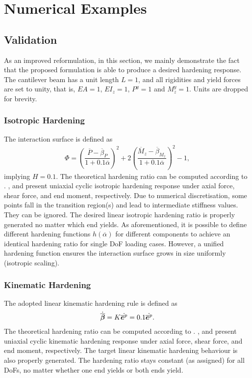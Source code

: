 \section{Numerical Examples}
\subsection{Validation}
As an improved reformulation, in this section, we mainly demonstrate the fact that the proposed formulation is able to produce a desired hardening response.
The cantilever beam has a unit length $L=1$, and all rigidities and yield forces are set to unity, that is, $EA=1$, $EI_z=1$, $P^y=1$ and $M^y_z=1$.
Units are dropped for brevity.
\subsubsection{Isotropic Hardening}
The interaction surface is defined as
\begin{gather}
\Phi=\left(\dfrac{\overline{P}-\overline{\beta}_P}{1+0.1\overline{\alpha}}\right)^2+2\left(\dfrac{\overline{M}_z-\overline{\beta}_{M_z}}{1+0.1\overline{\alpha}}\right)^2-1,
\end{gather}
implying $H=0.1$.
The theoretical hardening ratio can be computed according to .
,  and  present uniaxial cyclic isotropic hardening response under axial force, shear force, and end moment, respectively.
Due to numerical discretisation, some points fall in the transition region(s) and lead to intermediate stiffness values.
They can be ignored.
The desired linear isotropic hardening ratio is properly generated no matter which end yields.
As aforementioned, it is possible to define different hardening functions $h\left(\overline{\alpha}\right)$ for different components to achieve an identical hardening ratio for single DoF loading cases.
However, a unified hardening function ensures the interaction surface grows in size uniformly (isotropic scaling).
\subsubsection{Kinematic Hardening}
The adopted linear kinematic hardening rule is defined as
\begin{gather}
\dot{\overline{\bm{\beta}}}=K\dot{\overline{\bm{e}}^p}=0.1\dot{\overline{\bm{e}}^p}.
\end{gather}
The theoretical hardening ratio can be computed according to .
,  and  present uniaxial cyclic kinematic hardening response under axial force, shear force, and end moment, respectively.
The target linear kinematic hardening behaviour is also properly generated.
The hardening ratio stays constant (as assigned) for all DoFs, no matter whether one end yields or both ends yield.
